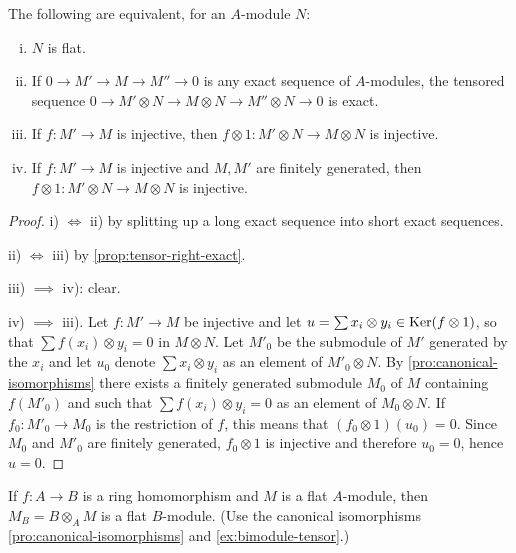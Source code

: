 \begin{proposition}\label{prop:flat-equivalent}
The following are equivalent, for an $A$-module $N$:
\begin{enumerate}[i)]
    \item $N$ is flat.
    \item If $0 \longrightarrow M' \longrightarrow M \longrightarrow M'' \longrightarrow 0$ is any exact sequence of $A$-modules, the tensored sequence $0 \longrightarrow M' \otimes N \longrightarrow M \otimes N \longrightarrow M'' \otimes N \longrightarrow 0$ is exact.
    \item If $f \colon M' \to M$ is injective, then $f \otimes 1 \colon M' \otimes N \longrightarrow M \otimes N$ is injective.
    \item If $f \colon M' \to M$ is injective and $M, M'$ are finitely generated, then $f \otimes 1 \colon M' \otimes N \to M \otimes N$ is injective.
\end{enumerate}
\end{proposition}

\begin{proof}
i) $\iff$ ii) by splitting up a long exact sequence into short exact sequences.

ii) $\iff$ iii) by \eqref{prop:tensor-right-exact}.

iii) $\implies$ iv): clear.

iv) $\implies$ iii). Let $f \colon M' \to M$ be injective and let $u = \sum x_i \otimes y_i \in \operatorname{Ker}(f \otimes 1)$, so that $\sum f(x_i) \otimes y_i = 0$ in $M \otimes N$. Let $M'_0$ be the submodule of $M'$ generated by the $x_i$ and let $u_0$ denote $\sum x_i \otimes y_i$ as an element of $M'_0 \otimes N$. By \eqref{pro:canonical-isomorphisms} there exists a finitely generated submodule $M_0$ of $M$ containing $f(M'_0)$ and such that $\sum f(x_i) \otimes y_i = 0$ as an element of $M_0 \otimes N$. If $f_0 \colon M'_0 \to M_0$ is the restriction of $f$, this means that $(f_0 \otimes 1)(u_0) = 0$. Since $M_0$ and $M'_0$ are finitely generated, $f_0 \otimes 1$ is injective and therefore $u_0 = 0$, hence $u = 0$.
\end{proof}

\begin{exercise}\label{ex:flat-base-change}
If $f \colon A \to B$ is a ring homomorphism and $M$ is a flat $A$-module, then $M_B = B \otimes_A M$ is a flat $B$-module. (Use the canonical isomorphisms \eqref{pro:canonical-isomorphisms} and \eqref{ex:bimodule-tensor}.)
\end{exercise}

